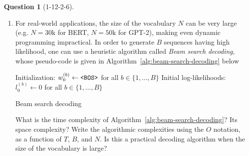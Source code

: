 \documentclass[12pt]{article}
\theoremstyle{definition}
\newtheorem{exercise}{Question}%
\begin{document}
\begin{exercise}[1-12-2-6]
{\begin{enumerate}[label=\arabic{exercise}.\arabic*]
\begin{enumerate}[label=\arabic{exercise}.\arabic{enumi}.\alph*]
        \item When the size of the vocabulary $N$ is not too large, can you use this algorithm to generate the most likely sequence of a language model defined by a recurrent neural network, such as a GRU or an LSTM? Why? Why not? If not, name a language model you can apply this algorithm to.
    \end{enumerate}
    
    \item For real-world applications, the size of the vocabulary $N$ can be very large (e.g. $N = 30\textrm{k}$ for BERT, $N = 50\textrm{k}$ for GPT-2), making even dynamic programming impractical. In order to generate $B$ sequences having high likelihood, one can use a heuristic algorithm called \emph{Beam search decoding}, whose pseudo-code is given in Algorithm~\ref{alg:beam-search-decoding} below

    \begin{minipage}{\linewidth}
    \begin{algorithm}[H]
    \DontPrintSemicolon
    Initialization: $w_{0}^{(b)} \leftarrow \textrm{\texttt{<BOS>}}$ for all $b \in \{1,\ldots,B\}$\;
    Initial log-likelihoods: $l_{0}^{(b)} \leftarrow 0$ for all $b \in \{1,\ldots,B\}$\;
    \caption{Beam search decoding}
    \label{alg:beam-search-decoding}
    \end{algorithm}
    \end{minipage}
    
    What is the time complexity of Algorithm~\ref{alg:beam-search-decoding}? Its space complexity? Write the algorithmic complexities using the $O$ notation, as a function of $T$, $B$, and $N$. Is this a practical decoding algorithm when the size of the vocabulary is large?
    

\end{enumerate}}
\end{exercise}
\end{document}
